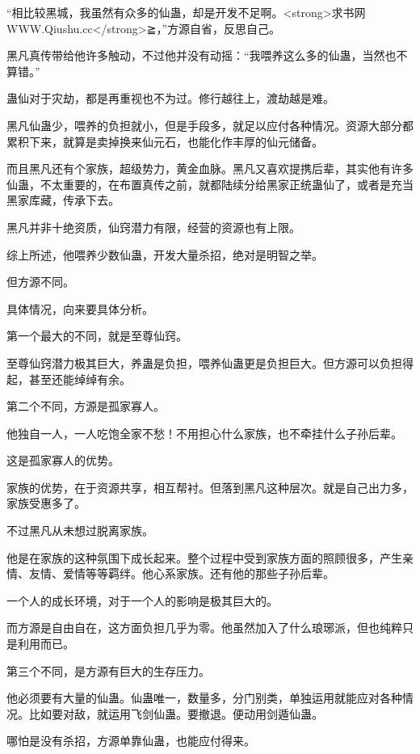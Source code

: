 
\begin{this_body}

“相比较黑城，我虽然有众多的仙蛊，却是开发不足啊。<strong>求书网WWW.Qiushu.cc</strong>≧，”方源自省，反思自己。

黑凡真传带给他许多触动，不过他并没有动摇：“我喂养这么多的仙蛊，当然也不算错。”

蛊仙对于灾劫，都是再重视也不为过。修行越往上，渡劫越是难。

黑凡仙蛊少，喂养的负担就小，但是手段多，就足以应付各种情况。资源大部分都累积下来，就算是卖掉换来仙元石，也能化作丰厚的仙元储备。

而且黑凡还有个家族，超级势力，黄金血脉。黑凡又喜欢提携后辈，其实他有许多仙蛊，不太重要的，在布置真传之前，就都陆续分给黑家正统蛊仙了，或者是充当黑家库藏，传承下去。

黑凡并非十绝资质，仙窍潜力有限，经营的资源也有上限。

综上所述，他喂养少数仙蛊，开发大量杀招，绝对是明智之举。

但方源不同。

具体情况，向来要具体分析。

第一个最大的不同，就是至尊仙窍。

至尊仙窍潜力极其巨大，养蛊是负担，喂养仙蛊更是负担巨大。但方源可以负担得起，甚至还能绰绰有余。

第二个不同，方源是孤家寡人。

他独自一人，一人吃饱全家不愁！不用担心什么家族，也不牵挂什么子孙后辈。

这是孤家寡人的优势。

家族的优势，在于资源共享，相互帮衬。但落到黑凡这种层次。就是自己出力多，家族受惠多了。

不过黑凡从未想过脱离家族。

他是在家族的这种氛围下成长起来。整个过程中受到家族方面的照顾很多，产生亲情、友情、爱情等等羁绊。他心系家族。还有他的那些子孙后辈。

一个人的成长环境，对于一个人的影响是极其巨大的。

而方源是自由自在，这方面负担几乎为零。他虽然加入了什么琅琊派，但也纯粹只是利用而已。

第三个不同，是方源有巨大的生存压力。

他必须要有大量的仙蛊。仙蛊唯一，数量多，分门别类，单独运用就能应对各种情况。比如要对敌，就运用飞剑仙蛊。要撤退。便动用剑遁仙蛊。

哪怕是没有杀招，方源单靠仙蛊，也能应付得来。


\end{this_body}
